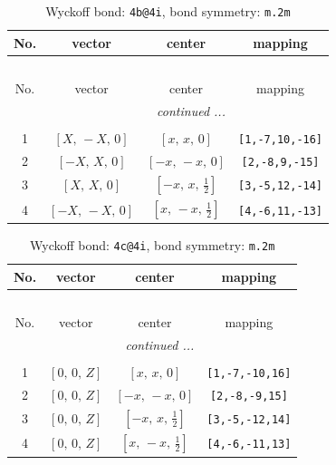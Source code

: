 \documentclass[fleqn,8pt]{jsarticle}
\begin{document}
\begin{longtable}{cccc}
\caption{Wyckoff bond: {\tt 4b@4i}, bond symmetry: {\tt m.2m}}
 \\
 \hline \hline
No. & vector & center & mapping \\ \hline \endfirsthead

\multicolumn{3}{l}{\tablename\ \thetable{}} \\
 \hline \hline
No. & vector & center & mapping \\ \hline \endhead

 \hline \hline
\multicolumn{3}{r}{\footnotesize\it continued ...} \\ \endfoot

 \hline \hline
\multicolumn{3}{r}{} \\ \endlastfoot

1 & $\left[ X,\, - X,\, 0 \right]$ & $\left[ x,\, x,\, 0 \right]$ & {\tt [1,-7,10,-16]} \\ \hline
2 & $\left[ - X,\, X,\, 0 \right]$ & $\left[ - x,\, - x,\, 0 \right]$ & {\tt [2,-8,9,-15]} \\ \hline
3 & $\left[ X,\, X,\, 0 \right]$ & $\left[ - x,\, x,\, \frac{1}{2} \right]$ & {\tt [3,-5,12,-14]} \\ \hline
4 & $\left[ - X,\, - X,\, 0 \right]$ & $\left[ x,\, - x,\, \frac{1}{2} \right]$ & {\tt [4,-6,11,-13]} \\
\end{longtable}
\renewcommand{\arraystretch}{1.2}
\begin{longtable}{cccc}
\caption{Wyckoff bond: {\tt 4c@4i}, bond symmetry: {\tt m.2m}}
 \\
 \hline \hline
No. & vector & center & mapping \\ \hline \endfirsthead

\multicolumn{3}{l}{\tablename\ \thetable{}} \\
 \hline \hline
No. & vector & center & mapping \\ \hline \endhead

 \hline \hline
\multicolumn{3}{r}{\footnotesize\it continued ...} \\ \endfoot

 \hline \hline
\multicolumn{3}{r}{} \\ \endlastfoot

1 & $\left[ 0,\, 0,\, Z \right]$ & $\left[ x,\, x,\, 0 \right]$ & {\tt [1,-7,-10,16]} \\ \hline
2 & $\left[ 0,\, 0,\, Z \right]$ & $\left[ - x,\, - x,\, 0 \right]$ & {\tt [2,-8,-9,15]} \\ \hline
3 & $\left[ 0,\, 0,\, Z \right]$ & $\left[ - x,\, x,\, \frac{1}{2} \right]$ & {\tt [3,-5,-12,14]} \\ \hline
4 & $\left[ 0,\, 0,\, Z \right]$ & $\left[ x,\, - x,\, \frac{1}{2} \right]$ & {\tt [4,-6,-11,13]} \\
\end{longtable}
\end{document}
